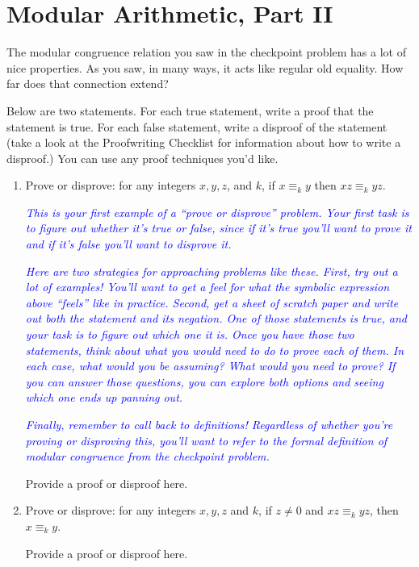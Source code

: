 \documentclass{article}
\renewcommand{\(}{\left(}
\renewcommand{\)}{\right)}
\theoremstyle{plain}
\theoremstyle{plain}
\theoremstyle{definition}
\begin{document}
\section{Modular Arithmetic, Part II}

The modular congruence relation you saw in the checkpoint problem has a lot of nice properties. As you saw, in many ways, it acts like regular old equality. How far does that connection extend?

Below are two statements. For each true statement, write a proof that the statement is true. For each false statement, write a disproof of the statement (take a look at the Proofwriting Checklist for information about how to write a disproof.) You can use any proof techniques you'd like. 

\begin{enumerate}[label*=\roman*.,ref=\roman*]

\item Prove or disprove: for any integers $x, y, z$, and $k$, if $x \equiv_k y$ then $xz \equiv_k yz$.

\textit{\textcolor{blue}{This is your first example of a ``prove or disprove'' problem. Your first task is to figure out whether it's true or false, since if it's true you'll want to prove it and if it's false you'll want to disprove it.}}

\textit{\textcolor{blue}{Here are two strategies for approaching problems like these. First, try out a lot of examples! You'll want to get a feel for what the symbolic expression above ``feels'' like in practice. Second, get a sheet of scratch paper and write out both the statement and its negation. One of those statements is true, and your task is to figure out which one it is. Once you have those two statements, think about what you would need to do to prove each of them. In each case, what would you be assuming? What would you need to prove? If you can answer those questions, you can explore both options and seeing which one ends up panning out.}}

\textit{\textcolor{blue}{Finally, remember to call back to definitions! Regardless of whether you're proving or disproving this, you'll want to refer to the formal definition of modular congruence from the checkpoint problem.}}

\begin{shaded}
Provide a proof or disproof here.
\end{shaded}

\item Prove or disprove: for any integers $x, y, z$ and $k$, if $z \neq 0$ and $xz \equiv_k yz$, then $x \equiv_k y$.


\begin{shaded}
Provide a proof or disproof here.
\end{shaded}

\end{enumerate}
\end{document}
